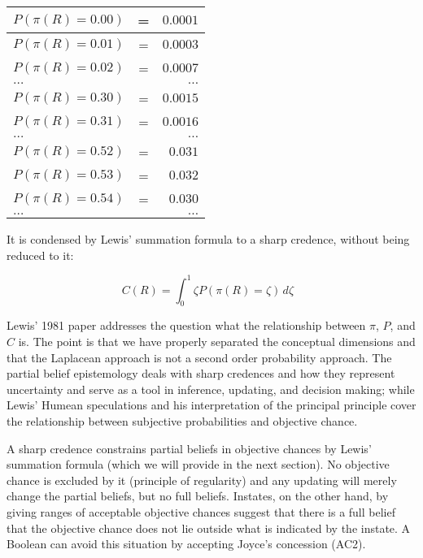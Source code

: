 \documentclass[11pt]{article}
\begin{document}
\begin{tabular}{|lcr|}
  \hline
  $P(\pi(R)=0.00)$ & = & $0.0001$ \\ \hline
  $P(\pi(R)=0.01)$ & = & $0.0003$ \\ \hline
  $P(\pi(R)=0.02)$ & = & $0.0007$ \\ \hline
  $\ldots$ & & $\ldots$ \\ \hline
  $P(\pi(R)=0.30)$ & = & $0.0015$ \\ \hline
  $P(\pi(R)=0.31)$ & = & $0.0016$ \\ \hline
  $\ldots$ & & $\ldots$ \\ \hline
  $P(\pi(R)=0.52)$ & = & $0.031$ \\ \hline
  $P(\pi(R)=0.53)$ & = & $0.032$ \\ \hline
  $P(\pi(R)=0.54)$ & = & $0.030$ \\ \hline
  $\ldots$ & & $\ldots$ \\ \hline
\end{tabular}

It is condensed by Lewis' summation formula to a sharp credence,
without being reduced to it:

\begin{equation}
  \label{eq:s2}
  C(R)=\int_{0}^{1}\zeta{}P(\pi(R)=\zeta)\,d\zeta\mbox{ }
\end{equation}

Lewis' 1981 paper 
addresses the question what the relationship between $\pi$, $P$, and
$C$ is. The point is that we have properly separated the conceptual
dimensions and that the Laplacean approach is not a second order
probability approach. The partial belief epistemology deals with sharp
credences and how they represent uncertainty and serve as a tool in
inference, updating, and decision making; while Lewis' Humean
speculations and his interpretation of the principal principle cover
the relationship between subjective probabilities and objective
chance.

A sharp credence constrains partial beliefs in objective chances by
Lewis' summation formula (which we will provide in the next section).
No objective chance is excluded by it (principle of regularity) and
any updating will merely change the partial beliefs, but no full
beliefs. Instates, on the other hand, by giving ranges of acceptable
objective chances suggest that there is a full belief that the
objective chance does not lie outside what is indicated by the
instate. A Boolean can avoid this situation by accepting Joyce's
concession (AC2).
\end{document}
